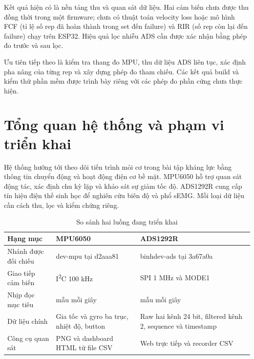 \documentclass[12pt,letterpaper]{article}
\newlength{\tablebodywidth}
\begin{document}
Kết quả hiện có là nền tảng thu và quan sát dữ liệu. Hai cảm biến chưa được thu đồng thời trong một firmware; chưa có thuật toán velocity loss hoặc mô hình FCF (tỉ lệ số rep đã hoàn thành trong set đến failure) và RIR (số rep còn lại đến failure) chạy trên ESP32. Hiệu quả lọc nhiễu ADS cần được xác nhận bằng phép đo trước và sau lọc.


Ưu tiên tiếp theo là kiểm tra thang đo MPU, thu dữ liệu ADS liên tục, xác định pha nâng của từng rep và xây dựng phép đo tham chiếu. Các kết quả build và kiểm thử phần mềm được trình bày riêng với các phép đo phần cứng chưa thực hiện.





\clearpage

\section{Tổng quan hệ thống và phạm vi triển khai}

Hệ thống hướng tới theo dõi tiến trình mỏi cơ trong bài tập kháng lực bằng thông tin chuyển động và hoạt động điện cơ bề mặt. MPU6050 hỗ trợ quan sát động tác, xác định chu kỳ lặp và khảo sát sự giảm tốc độ. ADS1292R cung cấp tín hiệu điện thế sinh học để nghiên cứu biên độ và phổ sEMG. Mỗi loại dữ liệu cần cách thu, lọc và kiểm chứng riêng.


\begin{table}[H]
\centering
\caption{So sánh hai luồng đang triển khai}
\begingroup
\fontsize{10.5}{12.5}\selectfont
\setlength{\tabcolsep}{5pt}
\setlength{\tablebodywidth}{\dimexpr\linewidth-6\tabcolsep-4\arrayrulewidth\relax}
\renewcommand{\arraystretch}{1.2}
\begin{tabular}{|>{\raggedright\arraybackslash}p{0.188889\tablebodywidth}|>{\raggedright\arraybackslash}p{0.405556\tablebodywidth}|>{\raggedright\arraybackslash}p{0.405556\tablebodywidth}|}
\hline
\rowcolor{tablehead}
{\color{white}\bfseries Hạng mục} & {\color{white}\bfseries MPU6050} & {\color{white}\bfseries ADS1292R} \\ \hline
Nhánh được đối chiếu & dev-mpu tại d2aaa81 & binhdev-ads tại 3a67a0a \\ \hline
\rowcolor{tablerow}
Giao tiếp cảm biến & I\textsuperscript{2}C 100 kHz & SPI 1 MHz và MODE1 \\ \hline
Nhịp đọc mục tiêu & 100 mẫu mỗi giây & 2000 mẫu mỗi giây \\ \hline
\rowcolor{tablerow}
Dữ liệu chính & Gia tốc và gyro ba trục, nhiệt độ, button & Raw hai kênh 24 bit, filtered kênh 2, sequence và timestamp \\ \hline
Công cụ quan sát & PNG và dashboard HTML từ file CSV & Web trực tiếp và recorder CSV \\ \hline
\end{tabular}
\endgroup
\end{table}
\end{document}
